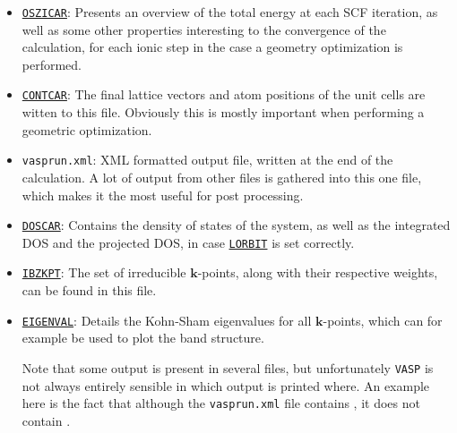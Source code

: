 \begin{refsection}
\begin{itemize}
 \label{appendix:sec-OSZICAR} 
\item \href{https://www.vasp.at/wiki/index.php/OSZICAR}{\texttt{OSZICAR}}: 
Presents an overview of the total energy at each SCF iteration, as well 
as some other properties interesting to the convergence of the calculation, 
for each ionic step in the case a geometry optimization is performed.

 \label{appendix:sec-CONTCAR} 
\item \href{https://www.vasp.at/wiki/index.php/CONTCAR}{\texttt{CONTCAR}}: 
The final lattice vectors and atom positions of the unit cells are witten to 
this file. Obviously this is mostly important when performing a geometric 
optimization.

 \label{appendix:sec-vasprun} 
\item \texttt{vasprun.xml}: 
XML formatted output file, written at the end of the calculation. A lot of 
output from other files is gathered into this one file, which makes it the 
most useful for post processing.

 \label{appendix:sec-DOSCAR} 
\item \href{https://www.vasp.at/wiki/index.php/DOSCAR}{\texttt{DOSCAR}}:
Contains the density of states of the system, as well as the integrated DOS 
and the projected DOS, in case \href{https://www.vasp.at/wiki/index.php/LORBIT}{\texttt{LORBIT}} is set correctly.

 \label{appendix:sec-IBZKPT} 
\item \href{https://www.vasp.at/wiki/index.php/IBZKPT}{\texttt{IBZKPT}}: 
The set of irreducible $\mathbf{k}$-points, along with their respective 
weights, can be found in this file.

 \label{appendix:sec-EIGENVAL} 
\item \href{https://www.vasp.at/wiki/index.php/EIGENVAL}{\texttt{EIGENVAL}}: 
Details the Kohn-Sham eigenvalues for all $\mathbf{k}$-points, which can 
for example be used to plot the band structure. 

Note that some output is present in several files, but unfortunately 
\texttt{VASP} is not always entirely sensible in which output is printed where. 
An example here is the fact that although the \texttt{vasprun.xml} file 
contains , it does not 
contain . 

\end{itemize} 
 

\end{refsection}
